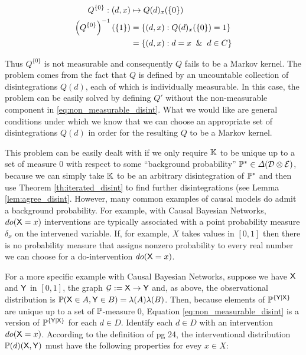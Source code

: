 \begin{align}
	Q^{\{0\}}:(d,x)&\mapsto Q(d)_x(\{0\})\\
	\left(Q^{\{0\}}\right)^{-1}(\{1\})&=\{(d,x):Q(d)_x(\{0\})=1\}\\
	&= \{(d,x):d=x\And d\in C\}
\end{align}

Thus $Q^{\{0\}}$ is not measurable and consequently $Q$ fails to be a Markov kernel. The problem comes from the fact that $Q$ is defined by an uncountable collection of disintegrations $Q(d)$, each of which is individually measurable. In this case, the problem can be easily solved by defining $Q'$ without the non-measurable component in \ref{eq:non_measurable_disint}. What we would like are general conditions under which we know that we can choose an appropriate set of disintegrations $Q(d)$ in order for the resulting $Q$ to be a Markov kernel.

This problem can be easily dealt with if we only require $\mathbb{K}$ to be unique up to a set of measure 0 with respect to some ``background probability'' $\mathbb{P}^*\in\Delta(\mathcal{D}\otimes\mathcal{E})$, because we can simply take $\mathbb{K}$ to be an arbitrary disintegration of $\mathbb{P}^*$ and then use Theorem \ref{th:iterated_disint} to find further disintegrations (see Lemma \ref{lem:agree_disint}. However, many common examples of causal models do admit a background probability. For example, with Causal Bayesian Networks, $do(\mathsf{X}=x)$ interventions are typically associated with a point probability measure $\delta_x$ on the intervened variable. If, for example, $X$ takes values in $[0,1]$ then there is no probability measure that assigns nonzero probability to every real number we can choose for a do-intervention $do(\mathsf{X}=x)$.

For a more specific example with Causal Bayesian Networks, suppose we have $\mathsf{X}$ and $\mathsf{Y}$ in $[0,1]$, the graph $\mathcal{G}:=\mathsf{X}\rightarrow \mathsf{Y}$ and, as above, the observational distribution is $\mathbb{P}(\mathsf{X}\in A,\mathsf{Y}\in B)=\lambda(A)\lambda(B)$. Then, because elements of $\mathbb{P}^{\{\mathsf{Y}|\mathsf{X}\}}$ are unique up to a set of $\mathbb{P}$-measure 0, Equation \ref{eq:non_measurable_disint} is a version of $\mathbb{P}^{\{\mathsf{Y}|\mathsf{X}\}}$ for each $d\in D$. Identify each $d\in D$ with an intervention $do(\mathsf{X}=x)$. According to the definition of \citet{pearl_causality:_2009} pg 24, the interventional distribution $\mathbb{P}(d)(\mathsf{X},\mathsf{Y})$ must have the following properties for evey $x\in X$:

